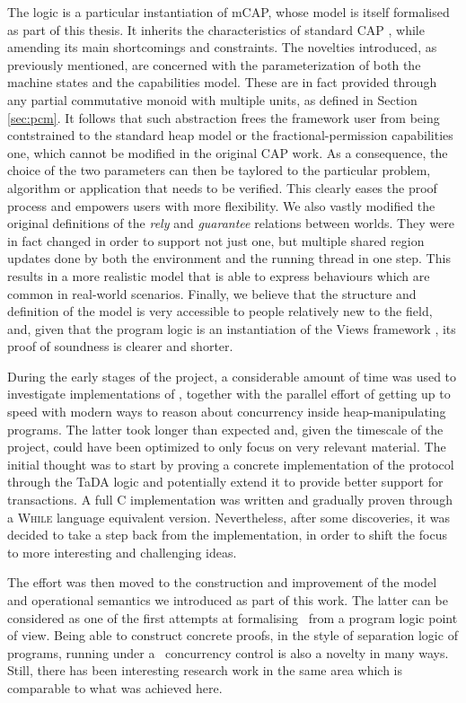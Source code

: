 The logic is a particular instantiation of mCAP, whose model is itself formalised as part of this thesis. It inherits the characteristics of standard CAP \cite{cap}, while amending its main shortcomings and constraints. The novelties introduced, as previously mentioned, are concerned with the parameterization of both the machine states and the capabilities model. These are in fact provided through any partial commutative monoid with multiple units, as defined in Section \ref{sec:pcm}. It follows that such abstraction frees the framework user from being contstrained to the standard heap model or the fractional-permission capabilities \cite{fractional} one, which cannot be modified in the original CAP work. As a consequence, the choice of the two parameters can then be taylored to the particular problem, algorithm or application that needs to be verified. This clearly eases the proof process and empowers users with more flexibility. We also vastly modified the original definitions of the \textit{rely} and \textit{guarantee} relations between worlds. They were in fact changed in order to support not just one, but multiple shared region updates done by both the environment and the running thread in one step. This results in a more realistic model that is able to express behaviours which are common in real-world scenarios. Finally, we believe that the structure and definition of the model is very accessible to people relatively new to the field, and, given that the program logic is an instantiation of the Views framework \cite{views}, its proof of soundness is clearer and shorter.

	During the early stages of the project, a considerable amount of time was used to investigate implementations of \tpl, together with the parallel effort of getting up to speed with modern ways to reason about concurrency inside heap-manipulating programs. The latter took longer than expected and, given the timescale of the project, could have been optimized to only focus on very relevant material. The initial thought was to start by proving a concrete implementation of the protocol through the TaDA logic \cite{tada} and potentially extend it to provide better support for transactions. A full C implementation was written and gradually proven through a \textsc{While} language equivalent version. Nevertheless, after some discoveries, it was decided to take a step back from the implementation, in order to shift the focus to more interesting and challenging ideas.

	The effort was then moved to the construction and improvement of the model and operational semantics we introduced as part of this work. The latter can be considered as one of the first attempts at formalising \tpl\ from a program logic point of view. Being able to construct concrete proofs, in the style of separation logic of programs, running under a \tpl\ concurrency control is also a novelty in many ways. Still, there has been interesting research work in the same area which is comparable to what was achieved here.

